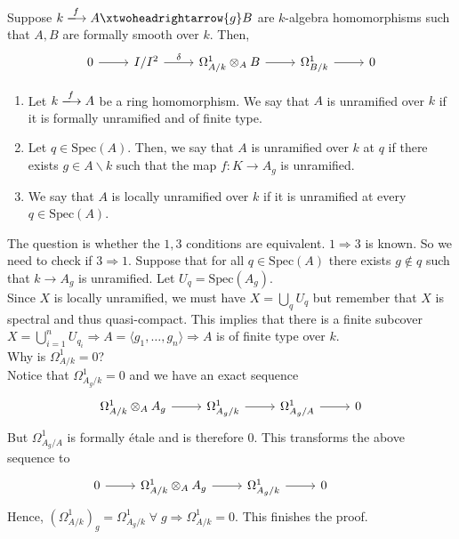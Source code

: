 \documentclass[oneside, 12pt]{scrbook}
\newcommand{\spec}{\mathrm{Spec}}
\newcommand{\bs}{\backslash}
\newcommand{\ds}{\displaystyle}
\theoremstyle{theorem}
\begin{document}
\begin{corollary}
Suppose $k \xlongrightarrow{f} A \xtwoheadrightarrow{g} B$ are $k$-algebra homomorphisms such that $A,B$ are formally smooth over $k$. Then,
\[\begin{tikzcd} 
	0 & {I/I^2} & {\Omega_{A/k}^{1} \otimes_{A} B} & {\Omega_{B/k}^{1}} & 0
	\arrow[from=1-1, to=1-2]
	\arrow["\delta", from=1-2, to=1-3]
	\arrow[from=1-3, to=1-4]
	\arrow[from=1-4, to=1-5]
\end{tikzcd}\]
\end{corollary}

\begin{definition}
\begin{enumerate}
\item Let $k \xlongrightarrow{f}A$ be a ring homomorphism. We say that $A$ is unramified over $k$ if it is formally unramified and of finite type.
\item Let $q\in \spec(A)$. Then, we say that $A$ is unramified over $k$ at $q$ if there exists $g\in A\bs k$ such that the map $f: K \rightarrow A_{g}$ is unramified.
\item We say that $A$ is locally unramified over $k$ if it is unramified at every $q\in \spec(A)$.
\end{enumerate}
\end{definition}

The question is whether the $1,3$ conditions are equivalent. $1\Rightarrow 3$ is known. So we need to check if $3 \Rightarrow 1$. Suppose that for all $q \in \spec(A)$ there exists $g \not \in q$ such that $k \rightarrow A_{g}$ is unramified. Let $U_{q} = \spec(A_{g})$. \\
Since $X$ is locally unramified, we must have $X = \ds{\bigcup_{q} U_{q}}$ but remember that $X$ is spectral and thus quasi-compact. This implies that there is a finite subcover $X = \ds{\bigcup_{i=1}^n U_{q_{i}}} \Rightarrow A = \langle g_{1} , \hdots , g_{n} \rangle \Rightarrow A$ is of finite type over $k$. \\

Why is $\Omega_{A/k}^1 = 0$?\\

Notice that $\Omega_{A_{g}/k}^{1} =0$ and we have an exact sequence
\[\begin{tikzcd}
	{\Omega_{A/k}^{1} \otimes_{A} A_{g}} & {\Omega_{A_{g}/k}^{1}} & {\Omega_{A_{g}/A}^{1}} & 0
	\arrow[from=1-1, to=1-2]
	\arrow[from=1-2, to=1-3]
	\arrow[from=1-3, to=1-4]
\end{tikzcd}\]
But $\Omega_{A_{g}/A}^{1}$ is formally \'{e}tale and is therefore $0$. This transforms the above sequence to 
\[\begin{tikzcd}
	0 & {\Omega_{A/k}^{1} \otimes_{A} A_{g}} & {\Omega_{A_{g}/k}^{1}} & 0 & {}
	\arrow[from=1-2, to=1-3]
	\arrow[from=1-3, to=1-4]
	\arrow[from=1-1, to=1-2]
\end{tikzcd}\]
Hence, $(\Omega_{A/k}^1)_{g} = \Omega_{A_{g}/k}^{1} \; \forall \; g \Rightarrow \Omega_{A/k}^{1} =0$. This finishes the proof.
\end{document}
